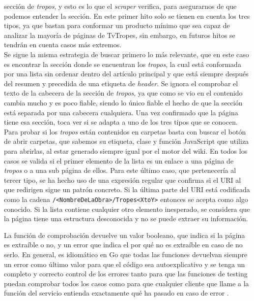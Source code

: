 \begin{itemize}
    sección de \textit{tropos}, y esto es lo que el \textit{scraper} verifica,
    para asegurarnos de que podemos entender la sección. En este primer hito
    solo se tienen en cuenta los tres tipos, ya que bastan para conformar un
    producto mínimo que sea capaz de analizar la mayoría de páginas de TvTropes,
    sin embargo, en futuros hitos se tendrán en cuenta casos más extremos.\\
    Se sigue la misma estrategia de buscar primero lo más relevante, que en este
    caso es encontrar la sección donde se encuentran los \textit{tropos}, la
    cual está conformada por una lista sin ordenar dentro del artículo principal
    y que está siempre después del resumen y precedida de una etiqueta de
    \textit{header}. Se ignora el comprobar el texto de la cabecera de la
    sección de \textit{tropos}, ya que como se vio en \cite{nishalscraping} el
    contenido cambia mucho y es poco fiable, siendo lo único fiable el hecho de
    que la sección está separada por una cabecera cualquiera. Una vez confirmado
    que la página tiene esa sección, toca ver si se adapta a uno de los tres
    tipos que se conocen. Para probar si los \textit{tropos} están contenidos en
    carpetas basta con buscar el botón de abrir carpetas, que sabemos su
    etiqueta, clase y función JavaScript que utiliza para abrirlas, al estar
    generado siempre igual por el motor del wiki. En todos los casos se valida
    si el primer elemento de la lista es un enlace a una página de
    \textit{tropos} o a una sub página de ellos. Para este último caso, que
    pertenecería al tercer tipo, se ha hecho uso de una expresión regular que
    confirma si el URI al que redirigen sigue un patrón concreto. Si la última
    parte del URI está codificada como la cadena
    \texttt{/<NombreDeLaObra>/Tropes<XtoY>} entonces se acepta como algo
    conocido. Si la lista contiene cualquier otro elemento inesperado, se
    considera que la página tiene una estructura desconocida y no se puede
    extraer su información.
\end{itemize}

La función de comprobación devuelve un valor booleano, que indica si la página
es extraíble o no, y un error que indica el por qué no es extraíble en caso de
no serlo. En general, es idiomático en Go que todas las funciones devuelvan
siempre un error como último valor para que el código sea autoexplicativo y se
tenga un completo y correcto control de los errores tanto para que las funciones
de testing puedan comprobar todos los casos como para que cualquier cliente que
llame a la función del servicio entienda exactamente qué ha pasado en caso de
error \cite{effective_go}.


